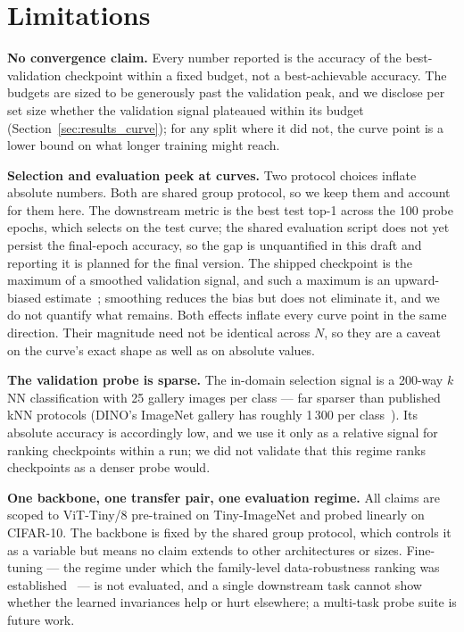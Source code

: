 \section{Limitations}
\label{sec:limitations}

\textbf{No convergence claim.} Every number reported is the accuracy of the
best-validation checkpoint within a fixed budget, not a best-achievable
accuracy. The budgets are sized to be generously past the validation peak,
and we disclose per set size whether the validation signal plateaued within
its budget (Section~\ref{sec:results_curve}); for any split where it did not,
the curve point is a lower bound on what longer training might reach.

\textbf{Selection and evaluation peek at curves.} Two protocol choices
inflate absolute numbers. Both are shared group protocol, so we keep them
and account for them here. The downstream metric is the best test top-1
across the 100 probe epochs, which selects on the test curve; the shared
evaluation script does not yet persist the final-epoch accuracy, so the gap
is unquantified in this draft and reporting it is planned for the final
version. The shipped checkpoint is
the maximum of a smoothed validation signal, and such a maximum is an
upward-biased estimate~\cite{cawley2010overfitting}; smoothing reduces the
bias but does not eliminate it, and we do not quantify what remains. Both
effects inflate every curve point in the same direction. Their magnitude
need not be identical across $N$, so they are a caveat on the curve's exact
shape as well as on absolute values.

\textbf{The validation probe is sparse.} The in-domain selection signal is a
200-way $k$NN classification with 25 gallery images per class --- far sparser
than published kNN protocols (DINO's ImageNet gallery has roughly 1\,300 per
class~\cite{caron2021dino}). Its absolute accuracy is accordingly low, and we
use it only as a relative signal for ranking checkpoints within a run; we did
not validate that this regime ranks checkpoints as a denser probe would.

\textbf{One backbone, one transfer pair, one evaluation regime.} All claims
are scoped to ViT-Tiny/8 pre-trained on Tiny-ImageNet and probed linearly on
CIFAR-10. The backbone is fixed by the shared group protocol, which controls
it as a variable but means no claim extends to other architectures or sizes.
Fine-tuning --- the regime under which the family-level data-robustness
ranking was established~\cite{elnouby2021largescale} --- is not evaluated,
and a single downstream task cannot show whether the learned invariances
help or hurt elsewhere; a multi-task probe suite is future work.

